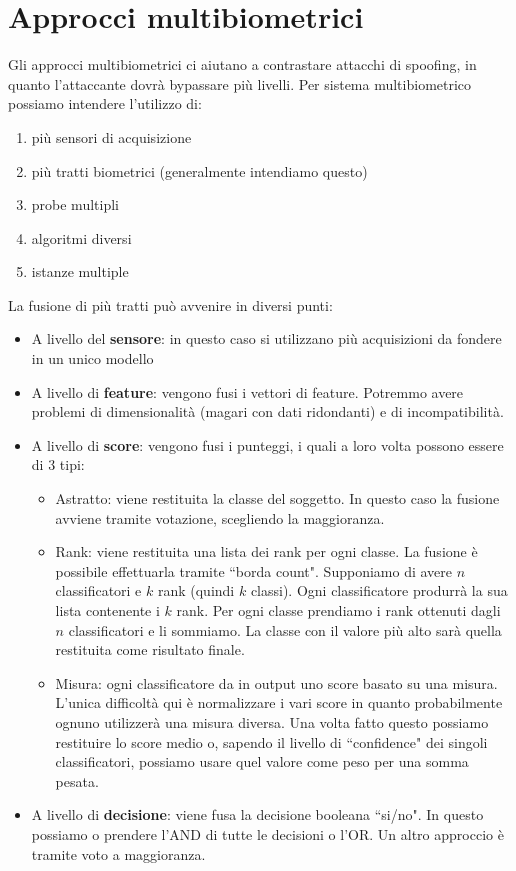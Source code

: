 \documentclass{article}
\begin{document}
\section{Approcci multibiometrici}
Gli approcci multibiometrici ci aiutano a contrastare attacchi di spoofing, in quanto l'attaccante dovrà bypassare più livelli. Per sistema multibiometrico possiamo intendere l'utilizzo di:
\begin{enumerate}
    \item più sensori di acquisizione
    \item più tratti biometrici (generalmente intendiamo questo)
    \item probe multipli
    \item algoritmi diversi
    \item istanze multiple
\end{enumerate}

La fusione di più tratti può avvenire in diversi punti:
\begin{itemize}
    \item A livello del \textbf{sensore}: in questo caso si utilizzano più acquisizioni da fondere in un unico modello
    \item A livello di \textbf{feature}: vengono fusi i vettori di feature. Potremmo avere problemi di dimensionalità (magari con dati ridondanti) e di incompatibilità.
    \item A livello di \textbf{score}: vengono fusi i punteggi, i quali a loro volta possono essere di 3 tipi:
    \begin{itemize}
        \item Astratto: viene restituita la classe del soggetto. In questo caso la fusione avviene tramite votazione, scegliendo la maggioranza. 
        \item Rank: viene restituita una lista dei rank per ogni classe. La fusione è possibile effettuarla tramite ``borda count". Supponiamo di avere $n$ classificatori e $k$ rank (quindi $k$ classi). Ogni classificatore produrrà la sua lista contenente i $k$ rank. Per ogni classe prendiamo i rank ottenuti dagli $n$ classificatori e li sommiamo. La classe con il valore più alto sarà quella restituita come risultato finale. 
        \item Misura: ogni classificatore da in output uno score basato su una misura. L'unica difficoltà qui è normalizzare i vari score in quanto probabilmente ognuno utilizzerà una misura diversa. Una volta fatto questo possiamo restituire lo score medio o, sapendo il livello di ``confidence" dei singoli classificatori, possiamo usare quel valore come peso per una somma pesata.
    \end{itemize}
    \item A livello di \textbf{decisione}: viene fusa la decisione booleana ``si/no". In questo possiamo o prendere l'AND di tutte le decisioni o l'OR. Un altro approccio è tramite voto a maggioranza. 
\end{itemize}
\end{document}
